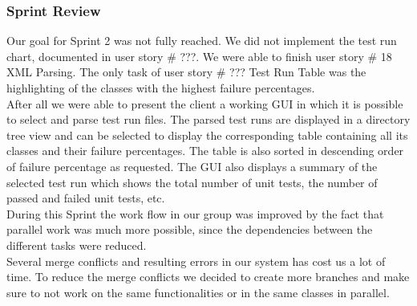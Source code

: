 \subsubsection*{Sprint Review}

Our goal for Sprint 2 was not fully reached. We did not implement the test run chart, documented in user story \# ???. We were able to finish user story \# 18 XML Parsing. The only task of user story \# ??? Test Run Table was the highlighting of the classes with the highest failure percentages. \\ 

After all we were able to present the client a working GUI in which it is possible to select and parse test run files. The parsed test runs are displayed in a directory tree view and can be selected to display the corresponding table containing all its classes and their failure percentages. The table is also sorted in descending order of failure percentage as requested. The GUI also displays a summary of the selected test run which shows the total number of unit tests, the number of passed and failed unit tests, etc. \\ 

During this Sprint the work flow in our group was improved by the fact that parallel work was much more possible, since the dependencies between the different tasks were reduced. \\ 

Several merge conflicts and resulting errors in our system has cost us a lot of time. To reduce the merge conflicts we decided to create more branches and make sure to not work on the same functionalities or in the same classes in parallel. \\ 
